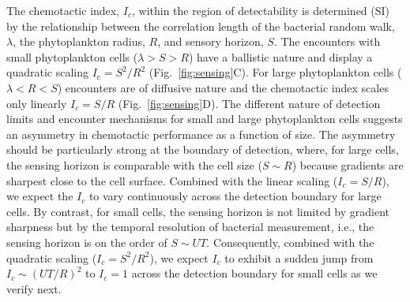 \documentclass[9pt,twocolumn,twoside]{pnas-new}
\begin{document}
The chemotactic index, $I_c$, within the region of detectability is determined (SI) by the relationship between the correlation length of the bacterial random walk, $\lambda$, the phytoplankton radius, $R$, and sensory horizon, $S$. The encounters with small phytoplankton cells ($\lambda>S>R$) have a ballistic nature and display a quadratic scaling $I_c = S^2/R^2$ (Fig.~\ref{fig:sensing}C). For large phytoplankton cells ($\lambda < R < S$) encounters are of diffusive nature and the chemotactic index scales only linearly $I_c = S/R$ (Fig.~\ref{fig:sensing}D).
The different nature of detection limits and encounter mechanisms for small and large phytoplankton cells suggests an asymmetry in chemotactic performance as a function of size. The asymmetry should be particularly strong at the boundary of detection, where, for large cells, the sensing horizon is comparable with the cell size ($S\sim R$) because gradients are sharpest close to the cell surface. Combined with the linear scaling ($I_c=S/R$), we expect the $I_c$ to vary continuously across the detection boundary for large cells. By contrast, for small cells, the sensing horizon is not limited by gradient sharpness but by the temporal resolution of bacterial measurement, i.e., the sensing horizon is on the order of $S\sim UT$. Consequently, combined with the quadratic scaling ($I_c = S^2/R^2$), we expect $I_c$ to exhibit a sudden jump from $I_c \sim (UT/R)^2$ to $I_c = 1$ across the detection boundary for small cells as we verify next. 
\end{document}
